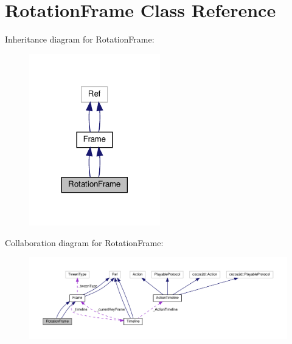 \hypertarget{classRotationFrame}{}\section{Rotation\+Frame Class Reference}
\label{classRotationFrame}


Inheritance diagram for Rotation\+Frame\+:
\nopagebreak
\begin{figure}[H]
\begin{center}
\leavevmode
\includegraphics[width=161pt]{classRotationFrame__inherit__graph}
\end{center}
\end{figure}


Collaboration diagram for Rotation\+Frame\+:
\nopagebreak
\begin{figure}[H]
\begin{center}
\leavevmode
\includegraphics[width=350pt]{classRotationFrame__coll__graph}
\end{center}
\end{figure}
